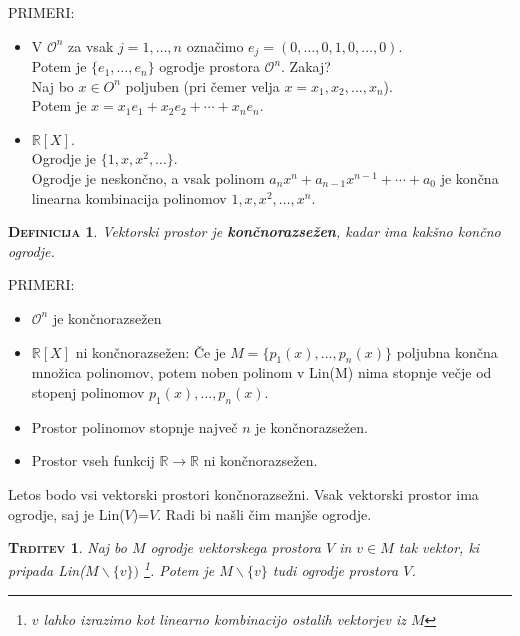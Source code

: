 \documentclass[a4paper,12pt]{article}
\newtheorem*{trditev}{\textsc{Trditev}}
\newtheorem*{definicija}{\textsc{Definicija}}
\begin{document}
\noindent PRIMERI:
\begin{itemize}
\item V $\mathcal{O} ^n$ za vsak $j=1,\ldots,n$ označimo $e_j=(0,\ldots,0,1,0,\ldots,0)$. \\

Potem je $\{e_1,\ldots,e_n\}$ ogrodje prostora $\mathcal{O} ^n$. Zakaj? \\

Naj bo $x\in O^n$ poljuben (pri čemer velja $x=x_1,x_2,\ldots,x_n$). \\

Potem je $x=x_1e_1+x_2e_2+\cdots+x_ne_n$.

\item $\mathbb{R}[X]$. \\

Ogrodje je $\{1,x,x^2,\ldots\}$. \\

Ogrodje je neskončno, a vsak polinom  $a_nx^n+a_{n-1}x^{n-1}+\cdots+a_0$ je končna linearna kombinacija polinomov $1,x,x^2,\ldots,x^n$. \\
\end{itemize}

\begin{definicija}
Vektorski prostor je \textbf{končnorazsežen}, kadar ima kakšno končno ogrodje. \\
\end{definicija}

\noindent PRIMERI:
\begin{itemize}
\item $\mathcal{O} ^n$ je končnorazsežen
\item $\mathbb{R}[X]$ ni končnorazsežen: Če je $M=\{p_1(x),\ldots,p_n(x)\}$ poljubna končna množica polinomov, potem noben polinom v Lin(M) nima stopnje večje od stopenj polinomov $p_1(x),\ldots,p_n(x)$. 
\item Prostor polinomov stopnje največ $n$ je končnorazsežen.
\item Prostor vseh funkcij $\mathbb{R}\to \mathbb{R}$ ni končnorazsežen.\\
\end{itemize}

\noindent Letos bodo vsi vektorski prostori končnorazsežni. Vsak vektorski prostor ima ogrodje, saj je Lin($V$)=$V$. Radi bi našli čim manjše ogrodje.\\

\begin{trditev}
Naj bo $M$ ogrodje vektorskega prostora $V$ in $v\in M$ tak vektor, ki \emph{pripada Lin($M\backslash \{v\})$} \footnote{$v$ lahko izrazimo kot linearno kombinacijo ostalih vektorjev iz $M$}. Potem je $M\backslash \{v\}$ tudi ogrodje prostora $V$. \\
\end{trditev}
\end{document}
